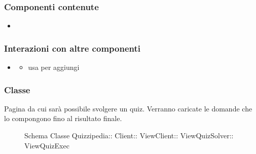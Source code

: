 \subsubsection{Componenti contenute}
\begin{itemize}
\item {}
\end{itemize}
\subsubsection{Interazioni con altre componenti}
\begin{itemize}
\item {}
\begin{itemize}
\item usa  per aggiungi
\end{itemize}
\end{itemize}
\subsubsection{Classe }
Pagina da cui sarà possibile svolgere un quiz. Verranno caricate le domande che lo compongono fino al risultato finale.
\begin{figure}[H]
\centering
\noindent{}
\caption[Schema Classe ViewQuizExec]{Schema Classe Quizzipedia:: Client:: ViewClient:: ViewQuizSolver:: ViewQuizExec}
\end{figure}

